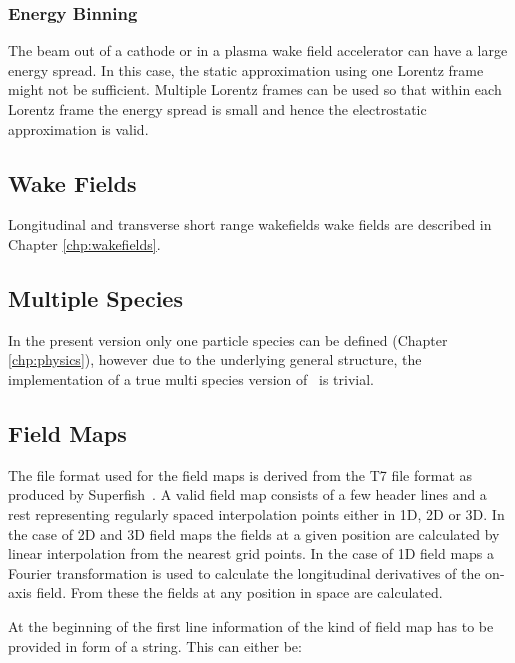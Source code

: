 \subsubsection{Energy Binning}
The beam out of a cathode or in a plasma wake field accelerator can have a large energy spread.
In this case, the static approximation using one Lorentz frame might not be sufficient. Multiple
Lorentz frames  can be used so that within each Lorentz frame the energy
spread is small and hence the electrostatic approximation is valid. 
 \latermore


\subsection{Wake Fields}
Longitudinal and transverse short range wakefields wake fields are described in Chapter \ref{chp:wakefields}.

\subsection{Multiple Species}
In the present version only one particle species can be defined (Chapter \ref{chp:physics}), however 
due to the underlying general structure, the implementation of a true multi species version of \opal\ is 
trivial. 

\subsection{Field Maps}
\label{sec:fieldmaps}
The file format used for the field maps is derived from the T7 file format as produced by Superfish~\cite{superfish}. A valid field map consists of a few header lines and a rest representing regularly spaced interpolation points either in 1D, 2D or 3D. In the case of 2D and 3D field maps the fields at a given position are calculated by linear interpolation from the nearest grid points. In the case of 1D field maps a Fourier transformation is used to calculate the longitudinal derivatives of the on-axis field. From these the fields at any position in space are calculated.

At the beginning of the first line information of the kind of field map has to be provided in form of a string. This can either be:

